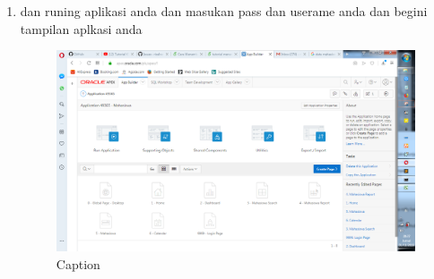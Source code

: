 \documentclass{article}
\begin{document}
\begin{enumerate}
\item dan runing aplikasi anda dan masukan pass dan userame anda dan begini tampilan aplkasi anda
\begin{figure}[!htbp]
    \centering
    \includegraphics[scale=0.4]{gambar/Capture9.PNG}
    \caption{Caption}
    \label{fig:my_label}
\end{figure}

\end{enumerate}
\end{document}
